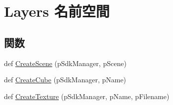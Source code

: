 \hypertarget{namespace_layers}{}\section{Layers 名前空間}
\label{namespace_layers}
\subsection*{関数}
\begin{DoxyCompactItemize}
\item 
def \hyperlink{namespace_layers_a309c2ef4c98c67e113f0a309920375b1}{Create\+Scene} (p\+Sdk\+Manager, p\+Scene)
\item 
def \hyperlink{namespace_layers_a6d94669cf23fce8c6889491ea2c6e2c3}{Create\+Cube} (p\+Sdk\+Manager, p\+Name)
\item 
def \hyperlink{namespace_layers_a50b169040adfa797674d44bd44f68236}{Create\+Texture} (p\+Sdk\+Manager, p\+Name, p\+Filename)
\end{DoxyCompactItemize}
